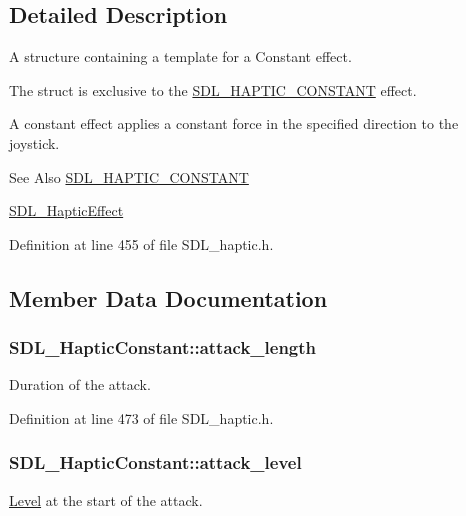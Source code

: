\subsection{Detailed Description}
A structure containing a template for a Constant effect. 

The struct is exclusive to the \hyperlink{_s_d_l__haptic_8h_a955fb9f680dcf9cc72a3d5263e85b80a}{S\-D\-L\-\_\-\-H\-A\-P\-T\-I\-C\-\_\-\-C\-O\-N\-S\-T\-A\-N\-T} effect.

A constant effect applies a constant force in the specified direction to the joystick.

\begin{DoxySeeAlso}{See Also}
\hyperlink{_s_d_l__haptic_8h_a955fb9f680dcf9cc72a3d5263e85b80a}{S\-D\-L\-\_\-\-H\-A\-P\-T\-I\-C\-\_\-\-C\-O\-N\-S\-T\-A\-N\-T} 

\hyperlink{union_s_d_l___haptic_effect}{S\-D\-L\-\_\-\-Haptic\-Effect} 
\end{DoxySeeAlso}


Definition at line 455 of file S\-D\-L\-\_\-haptic.\-h.



\subsection{Member Data Documentation}
\hypertarget{struct_s_d_l___haptic_constant_a907bade68ab53fb24e7d2651d19b767f}{
\subsubsection[{attack\-\_\-length}]{ S\-D\-L\-\_\-\-Haptic\-Constant\-::attack\-\_\-length}}\label{struct_s_d_l___haptic_constant_a907bade68ab53fb24e7d2651d19b767f}
Duration of the attack. 

Definition at line 473 of file S\-D\-L\-\_\-haptic.\-h.

\hypertarget{struct_s_d_l___haptic_constant_a0928a37f3fab0e5b7daffc7a1d65744c}{
\subsubsection[{attack\-\_\-level}]{ S\-D\-L\-\_\-\-Haptic\-Constant\-::attack\-\_\-level}}\label{struct_s_d_l___haptic_constant_a0928a37f3fab0e5b7daffc7a1d65744c}
\hyperlink{class_level}{Level} at the start of the attack. 

